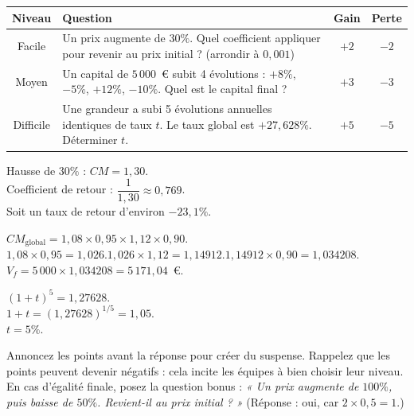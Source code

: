 \documentclass[12pt,a4paper]{article}
\begin{document}
\vspace{0.3cm}

\begin{center}
\renewcommand{\arraystretch}{1.5}
\begin{tabular}{|c|p{8.5cm}|c|c|}
\hline
\textbf{Niveau} & \textbf{Question} & \textbf{Gain} & \textbf{Perte} \\
\hline
Facile & Un prix augmente de \(30\%\). Quel coefficient appliquer pour revenir au prix initial ? (arrondir à \(0{,}001\)) & \(+2\) & \(-2\) \\
\hline
Moyen & Un capital de \(5\,000\)~\euro{} subit 4 évolutions : \(+8\%\), \(-5\%\), \(+12\%\), \(-10\%\). Quel est le capital final ? & \(+3\) & \(-3\) \\
\hline
Difficile & Une grandeur a subi 5 évolutions annuelles identiques de taux \(t\). Le taux global est \(+27{,}628\%\). Déterminer \(t\). & \(+5\) & \(-5\) \\
\hline
\end{tabular}
\end{center}

\vspace{0.3cm}

\begin{corrige}[title={Corrigé -- Niveau facile}]
Hausse de \(30\%\) : \(CM = 1{,}30\).\\[0.2cm]
Coefficient de retour : \(\dfrac{1}{1{,}30} \approx 0{,}769\).\\[0.2cm]
Soit un taux de retour d'environ \(-23{,}1\%\).
\end{corrige}

\begin{corrige}[title={Corrigé -- Niveau moyen}]
\(CM_{\text{global}} = 1{,}08 \times 0{,}95 \times 1{,}12 \times 0{,}90\).\\[0.2cm]
\(1{,}08 \times 0{,}95 = 1{,}026\).\quad \(1{,}026 \times 1{,}12 = 1{,}14912\).\quad \(1{,}14912 \times 0{,}90 = 1{,}034208\).\\[0.2cm]
\(V_f = 5\,000 \times 1{,}034208 = 5\,171{,}04\)~\euro{}.
\end{corrige}

\begin{corrige}[title={Corrigé -- Niveau difficile}]
\((1+t)^5 = 1{,}27628\).\\[0.2cm]
\(1+t = (1{,}27628)^{1/5} = 1{,}05\).\\[0.2cm]
\(t = 5\%\).
\end{corrige}

\begin{conseil}
Annoncez les points avant la réponse pour créer du suspense. Rappelez que les points peuvent devenir négatifs : cela incite les équipes à bien choisir leur niveau. En cas d'égalité finale, posez la question bonus : \textit{« Un prix augmente de \(100\%\), puis baisse de \(50\%\). Revient-il au prix initial ? »} (Réponse : oui, car \(2 \times 0{,}5 = 1\).)
\end{conseil}
\end{document}
